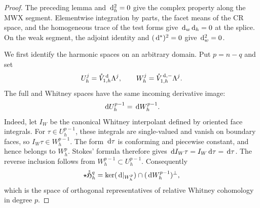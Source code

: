 \documentclass[10pt]{amsart}
\numberwithin{equation}{section}
\newcommand{\dd}{\,{\rm d}}
\begin{document}
\begin{proof}
The preceding lemma and $\dd_h^2=0$ give the complex property along
the MWX segment. Elementwise integration by parts, the facet means
of the CR space, and the homogeneous trace of the test forms give
$\dd_w\dd_h=0$ at the splice. On the weak segment, the adjoint identity
and $(\dd^*)^2=0$ give $\dd_w^2=0$.

We first identify the harmonic spaces on an arbitrary domain. Put $p=n-q$
and set
\[
U_h^j=\mathring V_{1,h}^{\dd}\Lambda^j,
\qquad W_h^j=\mathring V_{1,h}^{\dd,-}\Lambda^j.
\]
The full and Whitney spaces have the same incoming derivative image:
\begin{equation}\label{eq:fullWhitneyDerivativeImage}
\dd U_h^{p-1}=\dd W_h^{p-1}.
\end{equation}
Indeed, let $I_W$ be the canonical Whitney interpolant defined by oriented
face integrals. For $\tau\in U_h^{p-1}$, these integrals are single-valued
and vanish on boundary faces, so $I_W\tau\in W_h^{p-1}$.
The form $\dd\tau$ is conforming and piecewise constant, and hence belongs
to $W_h^p$. Stokes' formula therefore gives
$\dd I_W\tau=I_W\dd\tau=\dd\tau$.
The reverse inclusion follows from $W_h^{p-1}\subset U_h^{p-1}$.
Consequently
\[
\star\mathring{\mathfrak H}_h^q
=\ker(\dd|_{W_h^p})\cap(\dd W_h^{p-1})^\perp,
\]
which is the space of orthogonal representatives of relative Whitney
cohomology in degree $p$.


\end{proof}
\end{document}
